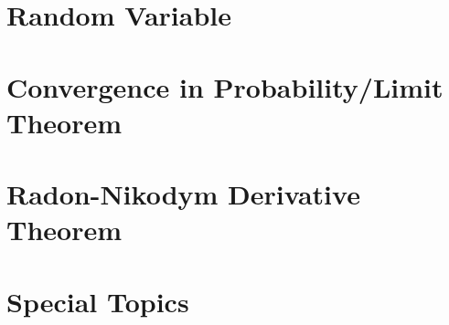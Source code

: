 \documentclass[11pt,fleqn]{book} %
\begin{document}
\chapter{Random Variable}




\chapter{Convergence in Probability/Limit Theorem}




\chapter{Radon-Nikodym Derivative Theorem}



\chapter{Special Topics}



\end{document}
